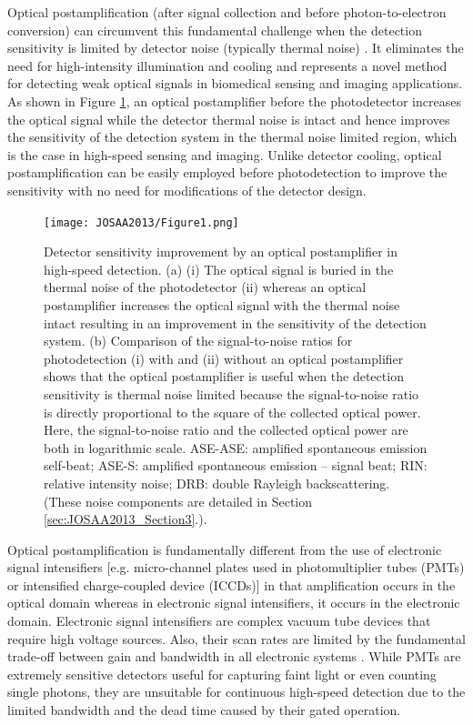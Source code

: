 Optical postamplification (after signal collection and before photon-to-electron conversion) can circumvent this fundamental challenge when the detection sensitivity is limited by detector noise (typically thermal noise) \cite{goda2009serial,goda2008amplified,mahjoubfar2011high,goda2009theory,tsia2010performance,qian2009real,han2003photonic,goda2013dispersive}. It eliminates the need for high-intensity illumination and cooling and represents a novel method for detecting weak optical signals in biomedical sensing and imaging applications. As shown in Figure \ref{fig:JOSAA2013_Figure1}, an optical postamplifier before the photodetector increases the optical signal while the detector thermal noise is intact and hence improves the sensitivity of the detection system in the thermal noise limited region, which is the case in high-speed sensing and imaging. Unlike detector cooling, optical postamplification can be easily employed before photodetection to improve the sensitivity with no need for modifications of the detector design. 

\begin{figure}[htb!]
\centering
\texttt{[image: JOSAA2013/Figure1.png]}
\caption{Detector sensitivity improvement by an optical postamplifier in high-speed detection. (a) (i) The optical signal is buried in the thermal noise of the photodetector (ii) whereas an optical postamplifier increases the optical signal with the thermal noise intact resulting in an improvement in the sensitivity of the detection system. (b) Comparison of the signal-to-noise ratios for photodetection (i) with and (ii) without an optical postamplifier shows that the optical postamplifier is useful when the detection sensitivity is thermal noise limited because the signal-to-noise ratio is directly proportional to the square of the collected optical power. Here, the signal-to-noise ratio and the collected optical power are both in logarithmic scale. ASE-ASE: amplified spontaneous emission self-beat; ASE-S: amplified spontaneous emission -- signal beat; RIN: relative intensity noise; DRB: double Rayleigh backscattering. (These noise components are detailed in Section \ref{sec:JOSAA2013_Section3}.).}
\label{fig:JOSAA2013_Figure1}
\end{figure}

Optical postamplification is fundamentally different from the use of electronic signal intensifiers [e.g. micro-channel plates used in photomultiplier tubes (PMTs) or intensified charge-coupled device (ICCDs)] in that amplification occurs in the optical domain whereas in electronic signal intensifiers, it occurs in the electronic domain. Electronic signal intensifiers are complex vacuum tube devices that require high voltage sources. Also, their scan rates are limited by the fundamental trade-off between gain and bandwidth in all electronic systems \cite{horowitz1989art}. While PMTs are extremely sensitive detectors useful for capturing faint light or even counting single photons, they are unsuitable for continuous high-speed detection due to the limited bandwidth and the dead time caused by their gated operation.


